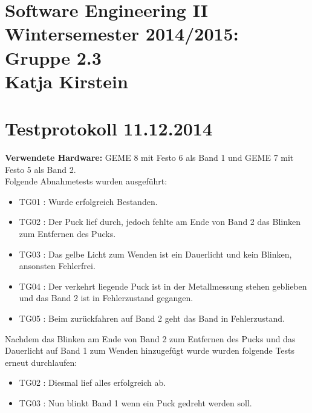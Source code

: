 \documentclass[a4paper,10pt]{article}
\begin{document}
\section*{\small{Software Engineering II \\ Wintersemester 2014/2015: Gruppe 2.3 \\ Katja Kirstein}}
\section*{Testprotokoll 11.12.2014}
\textbf{Verwendete Hardware:} GEME 8 mit Festo 6 als Band 1 und GEME 7 mit Festo 5 als Band 2.\\
Folgende Abnahmetests wurden ausgeführt:
\newline
\begin{itemize}
 \item TG01 : Wurde erfolgreich Bestanden.
 \item TG02 : Der Puck lief durch, jedoch fehlte am Ende von Band 2 das Blinken zum Entfernen des Pucks.
 \item TG03 : Das gelbe Licht zum Wenden ist ein Dauerlicht und kein Blinken, ansonsten Fehlerfrei.
 \item TG04 : Der verkehrt liegende Puck ist in der Metallmessung stehen geblieben und das Band 2 ist in Fehlerzustand gegangen.
 \item TG05 : Beim zurückfahren auf Band 2 geht das Band in Fehlerzustand.\\\newline
\end{itemize}


Nachdem das Blinken am Ende von Band 2 zum Entfernen des Pucks und das Dauerlicht auf Band 1 zum Wenden hinzugefügt 
wurde wurden folgende Tests erneut durchlaufen:
\begin{itemize}
 \item TG02 : Diesmal lief alles erfolgreich ab.
 \item TG03 : Nun blinkt Band 1 wenn ein Puck gedreht werden soll.
\end{itemize}
\end{document}
